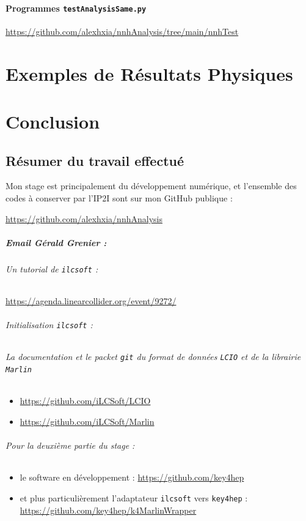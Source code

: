 \documentclass[10pt,a4paper]{report}
\begin{document}
\subsubsection{Programmes \texttt{testAnalysisSame.py}}



\url{https://github.com/alexhxia/nnhAnalysis/tree/main/nnhTest}


\chapter{Exemples de Résultats Physiques}

\chapter{Conclusion}

\section{Résumer du travail effectué}

Mon stage est principalement du développement numérique, et l'ensemble des codes à conserver par l'IP2I sont sur mon GitHub publique : 

\url{https://github.com/alexhxia/nnhAnalysis}

\paragraph{Email Gérald Grenier :}

\subparagraph{Un tutorial de \texttt{ilcsoft} :} 
\url{https://agenda.linearcollider.org/event/9272/}

\subparagraph{Initialisation \texttt{ilcsoft} :}

\subparagraph{La documentation et le packet \texttt{git} du format de données \texttt{LCIO} et de la librairie \texttt{Marlin}}
\begin{itemize}
	\item \url{https://github.com/iLCSoft/LCIO} \cite{Gaede:2003ip}
	\item \url{https://github.com/iLCSoft/Marlin}
\end{itemize}


\subparagraph{Pour la deuxième partie du stage :}
\begin{itemize}

	\item le software en développement : 
			\url{https://github.com/key4hep}
			
	\item et plus particulièrement l'adaptateur \texttt{ilcsoft} vers \texttt{key4hep} : 
			\url{https://github.com/key4hep/k4MarlinWrapper}
			
\end{itemize}  
\end{document}

